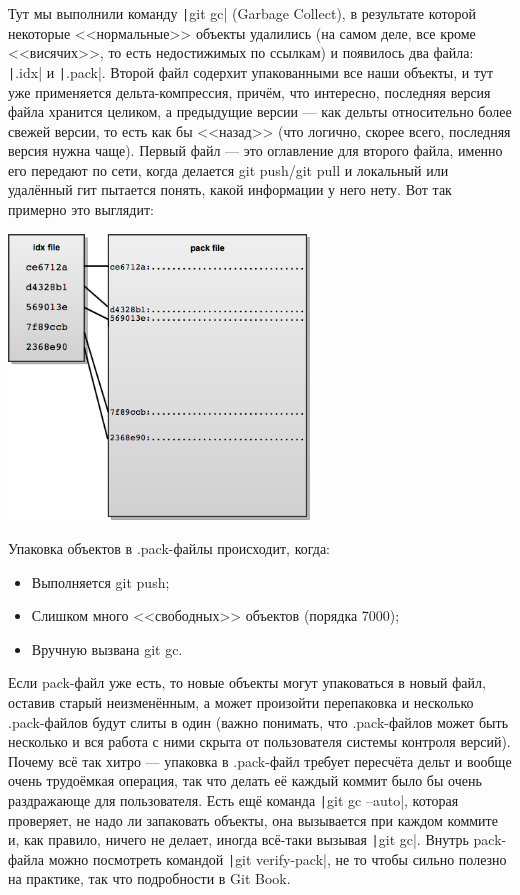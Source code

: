 \documentclass{../../text-style}
\begin{document}
Тут мы выполнили команду \texttt|git gc| (Garbage Collect), в результате которой некоторые <<нормальные>> объекты удалились (на самом деле, все кроме <<висячих>>, то есть недостижимых по ссылкам) и появилось два файла: \texttt|.idx| и \texttt|.pack|. Второй файл содерхит упакованными все наши объекты, и тут уже применяется дельта-компрессия, причём, что интересно, последняя версия файла хранится целиком, а предыдущие версии --- как дельты относительно более свежей версии, то есть как бы <<назад>> (что логично, скорее всего, последняя версия нужна чаще). Первый файл --- это оглавление для второго файла, именно его передают по сети, когда делается git push/git pull и локальный или удалённый гит пытается понять, какой информации у него нету. Вот так примерно это выглядит:

\begin{center}
    \includegraphics[width=0.6\textwidth]{gitPackFiles.png}
\end{center}

Упаковка объектов в .pack-файлы происходит, когда:
\begin{itemize}
    \item Выполняется git push;
    \item Слишком много <<свободных>> объектов (порядка 7000);
    \item Вручную вызвана git gc.
\end{itemize}

Если pack-файл уже есть, то новые объекты могут упаковаться в новый файл, оставив старый неизменённым, а может произойти перепаковка и несколько .pack-файлов будут слиты в один (важно понимать, что .pack-файлов может быть несколько и вся работа с ними скрыта от пользователя системы контроля версий). Почему всё так хитро --- упаковка в .pack-файл требует пересчёта дельт и вообще очень трудоёмкая операция, так что делать её каждый коммит было бы очень раздражающе для пользователя. Есть ещё команда \texttt|git gc --auto|, которая проверяет, не надо ли запаковать объекты, она вызывается при каждом коммите и, как правило, ничего не делает, иногда всё-таки вызывая \texttt|git gc|. Внутрь pack-файла можно посмотреть командой \texttt|git verify-pack|, не то чтобы сильно полезно на практике, так что подробности в Git Book.
\end{document}
